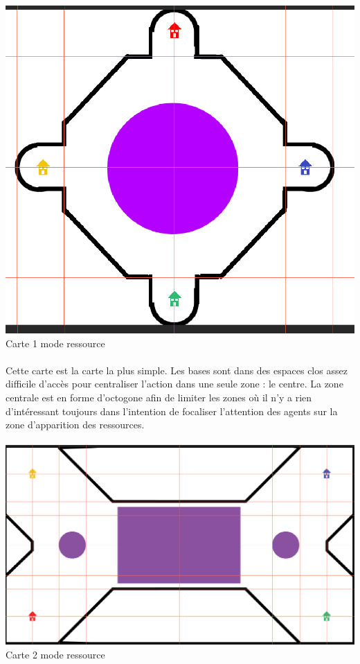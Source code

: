 \documentclass{report}
\begin{document}
\paragraph{}
\begin{center}
\includegraphics[scale=0.2]{DATA/carte+.png}
 {Carte 1 mode ressource}
\end{center}
\paragraph{}

Cette carte est la carte la plus simple. Les bases sont dans des espaces clos assez difficile d’accès pour centraliser l’action dans une seule zone : le centre. La zone centrale est en forme d’octogone afin de limiter les zones où il n’y a rien d’intéressant toujours dans l’intention de focaliser l’attention des agents sur la zone d’apparition des ressources.

\paragraph{}
\begin{center}
\includegraphics[scale=0.2]{DATA/carteX.png}
 {Carte 2 mode ressource}
\end{center}
\end{document}
